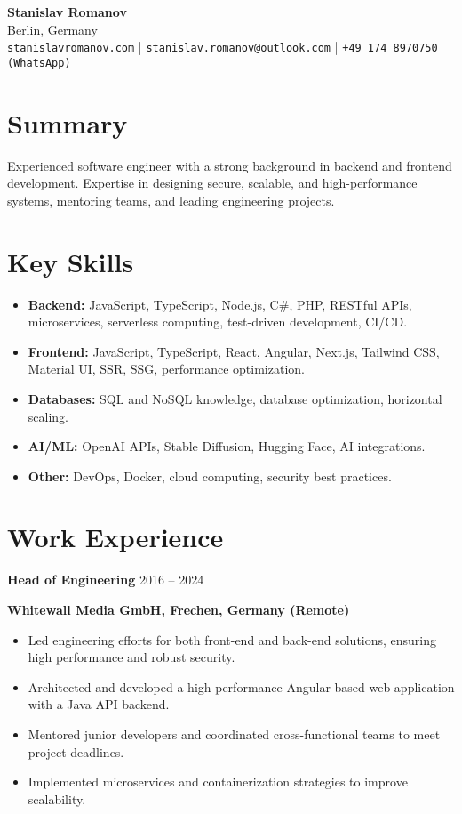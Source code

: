 \documentclass[a4paper,10pt]{article}
\begin{document}
\begin{center}
    {\LARGE \textbf{Stanislav Romanov}} \\
    \smallskip
    Berlin, Germany \\
    \texttt{stanislavromanov.com} | \texttt{stanislav.romanov@outlook.com} | \texttt{+49 174 8970750 (WhatsApp)} \\
\end{center}

\section{Summary}
Experienced software engineer with a strong background in backend and frontend development. Expertise in designing secure, scalable, and high-performance systems, mentoring teams, and leading engineering projects.

\section{Key Skills}
\begin{itemize}[noitemsep,topsep=0pt]
    \item \textbf{Backend:} JavaScript, TypeScript, Node.js, C\#, PHP, RESTful APIs, microservices, serverless computing, test-driven development, CI/CD.
    \item \textbf{Frontend:} JavaScript, TypeScript, React, Angular, Next.js, Tailwind CSS, Material UI, SSR, SSG, performance optimization.
    \item \textbf{Databases:} SQL and NoSQL knowledge, database optimization, horizontal scaling.
    \item \textbf{AI/ML:} OpenAI APIs, Stable Diffusion, Hugging Face, AI integrations.
    \item \textbf{Other:} DevOps, Docker, cloud computing, security best practices.
\end{itemize}

\section{Work Experience}
\textbf{        }
\textbf{        }
\textbf{}
\textbf{Head of Engineering} \hfill 2016 -- 2024 \par
\textbf{Whitewall Media GmbH, Frechen, Germany (Remote)} \par
\begin{itemize}[noitemsep,topsep=0pt]
    \item Led engineering efforts for both front-end and back-end solutions, ensuring high performance and robust security.
    \item Architected and developed a high-performance Angular-based web application with a Java API backend.
    \item Mentored junior developers and coordinated cross-functional teams to meet project deadlines.
    \item Implemented microservices and containerization strategies to improve scalability.
\end{itemize}
\vspace{6pt}
\end{document}
